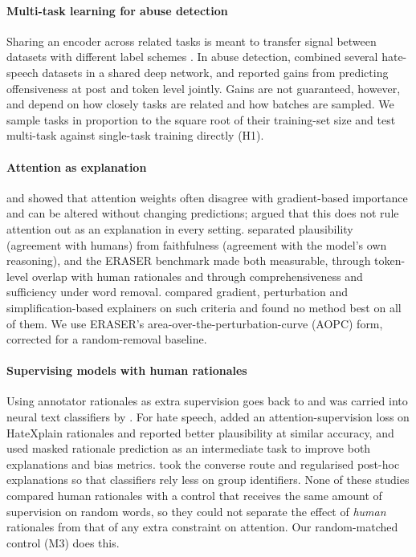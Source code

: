 \documentclass[preprint,12pt,authoryear]{elsarticle}
\begin{document}
\paragraph{Multi-task learning for abuse detection}
Sharing an encoder across related tasks is meant to transfer signal between datasets with different label schemes \citep{ruder2017overview}. In abuse detection, \citet{kapil2020deep} combined several hate-speech datasets in a shared deep network, and \citet{zampieri2023offensive} reported gains from predicting offensiveness at post and token level jointly. Gains are not guaranteed, however, and depend on how closely tasks are related and how batches are sampled. We sample tasks in proportion to the square root of their training-set size and test multi-task against single-task training directly (H1).

\paragraph{Attention as explanation}
\citet{jain2019attention} and \citet{serrano2019attention} showed that attention weights often disagree with gradient-based importance and can be altered without changing predictions; \citet{wiegreffe2019attention} argued that this does not rule attention out as an explanation in every setting. \citet{jacovi2020faithfully} separated plausibility (agreement with humans) from faithfulness (agreement with the model's own reasoning), and the ERASER benchmark \citep{deyoung2020eraser} made both measurable, through token-level overlap with human rationales and through comprehensiveness and sufficiency under word removal. \citet{atanasova2020diagnostic} compared gradient, perturbation and simplification-based explainers on such criteria and found no method best on all of them. We use ERASER's area-over-the-perturbation-curve (AOPC) form, corrected for a random-removal baseline.

\paragraph{Supervising models with human rationales}
Using annotator rationales as extra supervision goes back to \citet{zaidan2007using} and was carried into neural text classifiers by \citet{zhang2016rationale}. For hate speech, \citet{mathew2021hatexplain} added an attention-supervision loss on HateXplain rationales and reported better plausibility at similar accuracy, and \citet{kim2022hate} used masked rationale prediction as an intermediate task to improve both explanations and bias metrics. \citet{kennedy2020contextualizing} took the converse route and regularised post-hoc explanations so that classifiers rely less on group identifiers. None of these studies compared human rationales with a control that receives the same amount of supervision on random words, so they could not separate the effect of \emph{human} rationales from that of any extra constraint on attention. Our random-matched control (M3) does this.
\end{document}
